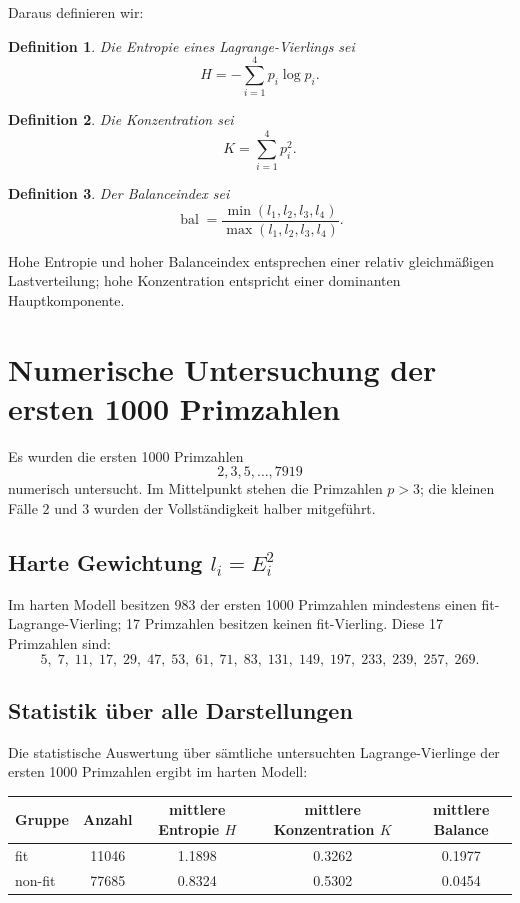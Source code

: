 \documentclass[11pt,a4paper]{article}
\newtheorem{definition}{Definition}
\theoremstyle{remark}
\begin{document}
	Daraus definieren wir:
	
	\begin{definition}
		Die \emph{Entropie} eines Lagrange-Vierlings sei
		\[
		H=-\sum_{i=1}^4 p_i\log p_i.
		\]
	\end{definition}
	
	\begin{definition}
		Die \emph{Konzentration} sei
		\[
		K=\sum_{i=1}^4 p_i^2.
		\]
	\end{definition}
	
	\begin{definition}
		Der \emph{Balanceindex} sei
		\[
		\operatorname{bal}
		=
		\frac{\min(l_1,l_2,l_3,l_4)}{\max(l_1,l_2,l_3,l_4)}.
		\]
	\end{definition}
	
	Hohe Entropie und hoher Balanceindex entsprechen einer relativ gleichmäßigen Lastverteilung; hohe Konzentration entspricht einer dominanten Hauptkomponente.
	
	\section{Numerische Untersuchung der ersten 1000 Primzahlen}
	
	Es wurden die ersten 1000 Primzahlen
	\[
	2,3,5,\dots,7919
	\]
	numerisch untersucht. Im Mittelpunkt stehen die Primzahlen \(p>3\); die kleinen Fälle \(2\) und \(3\) wurden der Vollständigkeit halber mitgeführt.
	
	\subsection{Harte Gewichtung \(l_i=E_i^2\)}
	
	Im harten Modell besitzen 983 der ersten 1000 Primzahlen mindestens einen fit-Lagrange-Vierling; 17 Primzahlen besitzen keinen fit-Vierling. Diese 17 Primzahlen sind:
	\[
	5,\;7,\;11,\;17,\;29,\;47,\;53,\;61,\;71,\;83,\;131,\;149,\;197,\;233,\;239,\;257,\;269.
	\]
	
	\subsection{Statistik über alle Darstellungen}
	
	Die statistische Auswertung über sämtliche untersuchten Lagrange-Vierlinge der ersten 1000 Primzahlen ergibt im harten Modell:
	
	\begin{center}
		\begin{tabular}{lcccc}
			\toprule
			Gruppe & Anzahl & mittlere Entropie \(H\) & mittlere Konzentration \(K\) & mittlere Balance \\
			\midrule
			fit     & 11046 & 1.1898 & 0.3262 & 0.1977 \\
			non-fit & 77685 & 0.8324 & 0.5302 & 0.0454 \\
			\bottomrule
		\end{tabular}
	\end{center}
	
\end{document}
